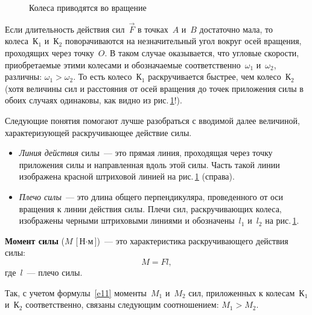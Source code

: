 \documentclass[main.tex]{subfiles}
\begin{document}
\begin{figure}[H]%
\hfill
\begin{subfigure}{\mylengtha}
\usebox{\myboxa}
\end{subfigure}%
\mbox{}
\hfill
\begin{subfigure}{\mylengthb}
\usebox{\myboxb}
\end{subfigure}%
\hfill
\mbox{}
\caption{Колеса приводятся во вращение}
\label{fig:p44}
\end{figure}


Если длительность действия сил~$\vec F$ в точках~$A$ и~$B$ достаточно мала, то колеса~К$_1$ и~К$_2$ поворачиваются на незначительный угол вокруг осей вращения, проходящих через точку~$O$. В таком случае оказывается, что угловые скорости, приобретаемые этими колесами и обозначаемые соответственно~$\omega_1$ и~$\omega_2$, различны: $\omega_1>\omega_2$. То есть колесо~К$_1$ раскручивается быстрее, чем колесо~К$_2$ (хотя величины сил и расстояния от осей вращения до точек приложения силы в обоих случаях одинаковы, как видно из рис.\,\ref{fig:p44}!).

Следующие понятия помогают лучше разобраться с вводимой далее величиной, характеризующей раскручивающее действие силы.
\begin{itemize}
    \item \emph{Линия действия} силы~--- это прямая линия, проходящая через точку приложения силы и направленная вдоль этой силы. Часть такой линии  изображена красной штриховой линией на рис.\,\ref{fig:p44} (справа).
    \item \emph{Плечо силы}~--- это длина общего перпендикуляра, проведенного от оси вращения к линии действия силы. Плечи сил, раскручивающих колеса, изображены черными штриховыми линиями и обозначены~$l_1$ и~$l_2$ на рис.\,\ref{fig:p44}. 
\end{itemize}

\textbf{Момент силы} ($M$ [$\text{Н}\cdot\text{м}$])~--- это характеристика раскручивающего действия силы:
\begin{equation}\label{e11}
    M=Fl,
\end{equation}
где~$l$~--- плечо силы.

Так, с учетом формулы~\eqref{e11} моменты~$M_1$ и~$M_2$ сил, приложенных к колесам~К$_1$ и~К$_2$ соответственно, связаны следующим соотношением: $M_1>M_2$.
 









 
\end{document}
